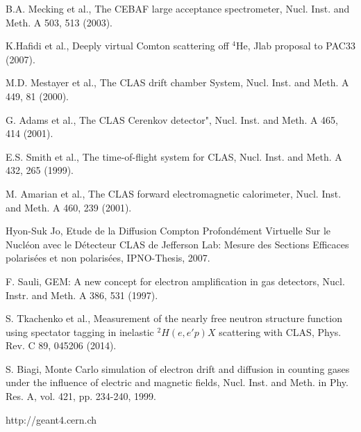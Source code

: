 \documentclass[aps,prl,twocolumn,showpacs,superscriptaddress,groupedaddress]{revtex4}
\begin{document}
\begin{thebibliography}{99}

   B.A. Mecking et al., The CEBAF large acceptance spectrometer, Nucl. Inst. 
   and Meth. A 503, 513 (2003).

   K.Hafidi et al., Deeply virtual Comton scattering off $^{4}$He, Jlab 
   proposal to PAC33 (2007).

   M.D. Mestayer et al., The CLAS drift chamber System, Nucl. Inst.  and Meth.  
   A 449, 81 (2000).

   G. Adams et al., The CLAS Cerenkov detector", Nucl. Inst. and Meth. A 465, 
   414 (2001).

   E.S. Smith et al., The time-of-flight system for CLAS, Nucl.  Inst. and 
   Meth. A 432, 265 (1999).

   M. Amarian et al., The CLAS forward electromagnetic calorimeter, Nucl.  
   Inst. and Meth. A 460, 239 (2001). 

   Hyon-Suk Jo, Etude de la Diffusion Compton Profond{\'e}ment Virtuelle Sur le 
   Nucl{\'e}on avec le D{\'e}tecteur CLAS de Jefferson Lab: Mesure des Sections 
   Efficaces polaris{\'e}es et non polaris{\'e}es, IPNO-Thesis, 2007.

   F. Sauli, GEM: A new concept for electron amplification in gas detectors, 
   Nucl. Instr. and Meth. A 386, 531 (1997).

   S. Tkachenko et al., Measurement of the nearly free neutron structure 
   function using spectator tagging in inelastic $^{2}H(e,e'p)X$ scattering 
   with CLAS,	Phys. Rev. C 89, 045206 (2014).

   S. Biagi, Monte Carlo simulation of electron drift and diffusion in counting 
   gases under the influence of electric and magnetic fields, Nucl.  Inst. and 
   Meth. in Phy. Res. A, vol. 421, pp. 234-240, 1999.

http://geant4.cern.ch

\end{thebibliography}
\end{document}
